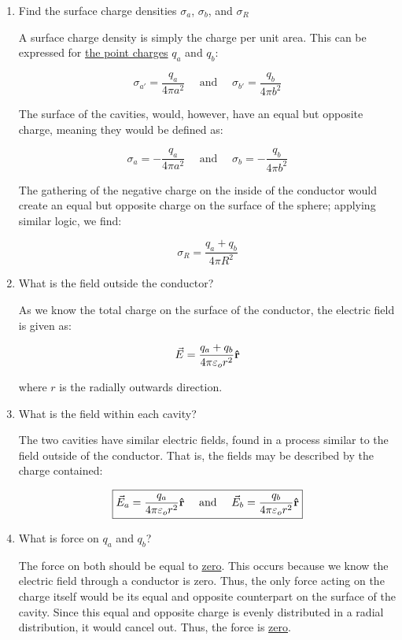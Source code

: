 \begin{enumerate}
    \begin{enumerate}

      \item Find the surface charge densities $\sigma_a$, $\sigma_b$, and $\sigma_R$

        A surface charge density is simply the charge per unit area. This can be expressed for \underline{the point charges} $q_a$ and $q_b$:

        $$\sigma_{a'}=\frac{q_a}{4\pi a^2}\quad\text{ and }\quad\sigma_{b'}=\frac{q_b}{4\pi b^2}$$

        The surface of the cavities, would, however, have an equal but opposite charge, meaning they would be defined as:

        $$\boxed{\sigma_a=-\frac{q_a}{4\pi a^2}\quad\text{ and }\quad\sigma_b=-\frac{q_b}{4\pi b^2}}$$

        The gathering of the negative charge on the inside of the conductor would create an equal but opposite charge on the surface of the sphere; applying similar logic, we find:

        $$\boxed{\sigma_R=\frac{q_a+q_b}{4\pi R^2}}$$

      \item What is the field outside the conductor?

        As we know the total charge on the surface of the conductor, the electric field is given as:

        $$\vec{E}=\frac{q_a+q_b}{4\pi\varepsilon_o r^2}\bold{\hat{r}}$$

        where $r$ is the radially outwards direction.

      \item What is the field within each cavity?

        The two cavities have similar electric fields, found in a process similar to the field outside of the conductor. That is, the fields may be described by the charge contained:

        $$\boxed{\vec{E}_a=\frac{q_a}{4\pi\varepsilon_o r^2}\bold{\hat{r}}\quad\text{ and }\quad\vec{E}_b=\frac{q_b}{4\pi\varepsilon_o r^2}\bold{\hat{r}}}$$

      \item What is force on $q_a$ and $q_b$?

        The force on both should be equal to \underline{zero}. This occurs because we know the electric field through a conductor is zero. Thus, the only force acting on the charge itself would be its equal and opposite counterpart on the surface of the cavity. Since this equal and opposite charge is evenly distributed in a radial distribution, it would cancel out. Thus, the force is \underline{zero}.


\end{enumerate}
\end{enumerate}
